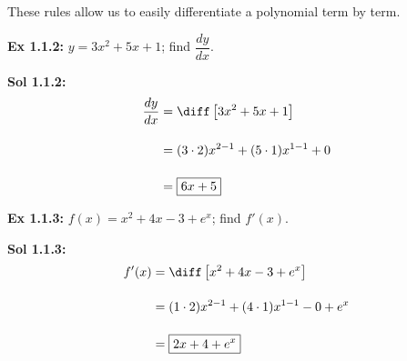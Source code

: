\begin{center}
\end{center}

These rules allow us to easily differentiate a polynomial term by term.

\begin{tcolorbox}[example]
    \textbf{Ex 1.1.2: } $y = 3x^2 + 5x + 1$; find $\dfrac{dy}{dx}$. 
\end{tcolorbox}
\begin{tcolorbox}[solution]
    \textbf{Sol 1.1.2: } \begin{align*}
        \dfrac{dy}{dx} & = \diff \left[3x^2 + 5x + 1\right] \\[11pt]
        & = (3 \cdot 2)x^{2 - 1} + (5 \cdot 1)x^{1 - 1} + 0 \\[11pt]
        & = \boxed{6x + 5} 
    \end{align*}
\end{tcolorbox} \vspace{11pt}

\begin{tcolorbox}[example]
    \textbf{Ex 1.1.3: } $f(x) = x^2 + 4x - 3 + e^x$; find $f'(x)$. 
\end{tcolorbox}
\begin{tcolorbox}[solution]
    \textbf{Sol 1.1.3: } \begin{align*}
        f'(x) & = \diff \left[x^2 + 4x - 3 + e^x\right] \\[11pt]
        & = (1 \cdot 2)x^{2 - 1} + (4 \cdot 1)x^{1 - 1} - 0 + e^x \\[11pt]
        & = \boxed{2x + 4 + e^x} 
    \end{align*}
\end{tcolorbox} \vspace{11pt}

